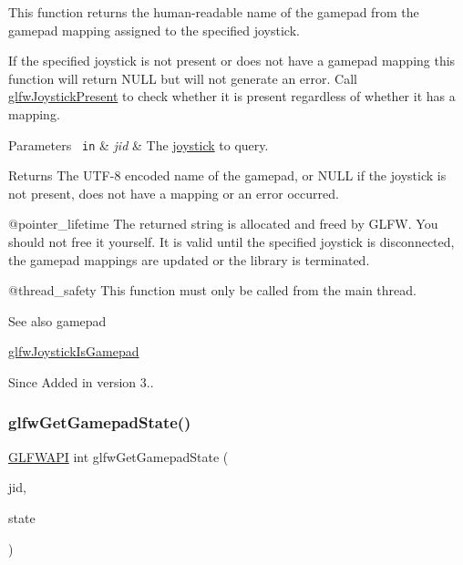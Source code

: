 This function returns the human-\/readable name of the gamepad from the gamepad mapping assigned to the specified joystick.

If the specified joystick is not present or does not have a gamepad mapping this function will return {\ttfamily N\+U\+LL} but will not generate an error. Call \mbox{\hyperlink{group__input_gacb1b7dfd79df673d48814c06fc436eff}{glfw\+Joystick\+Present}} to check whether it is present regardless of whether it has a mapping.


\begin{DoxyParams}[1]{Parameters}
\mbox{\texttt{ in}}  & {\em jid} & The \mbox{\hyperlink{group__joysticks}{joystick}} to query. \\
\hline
\end{DoxyParams}
\begin{DoxyReturn}{Returns}
The U\+T\+F-\/8 encoded name of the gamepad, or {\ttfamily N\+U\+LL} if the joystick is not present, does not have a mapping or an error occurred.
\end{DoxyReturn}
@pointer\+\_\+lifetime The returned string is allocated and freed by G\+L\+FW. You should not free it yourself. It is valid until the specified joystick is disconnected, the gamepad mappings are updated or the library is terminated.

@thread\+\_\+safety This function must only be called from the main thread.

\begin{DoxySeeAlso}{See also}
gamepad 

\mbox{\hyperlink{group__input_gac9720b6e5062a5fc5fc0bb4be6dc04a0}{glfw\+Joystick\+Is\+Gamepad}}
\end{DoxySeeAlso}
\begin{DoxySince}{Since}
Added in version 3.. 
\end{DoxySince}
\mbox{\label{group__input_ga6e138d3b0761546f5a12546f367501d6}} 
\subsubsection{\texorpdfstring{glfwGetGamepadState()}{glfwGetGamepadState()}}
{\footnotesize\ttfamily \mbox{\hyperlink{glfw3_8h_a56da5036b2cc259351ae22fd6439bb47}{G\+L\+F\+W\+A\+PI}} int glfw\+Get\+Gamepad\+State (\begin{DoxyParamCaption}\item[{int}]{jid,  }\item[{\mbox{\hyperlink{struct_g_l_f_wgamepadstate}{G\+L\+F\+Wgamepadstate}} $\ast$}]{state }\end{DoxyParamCaption})}




